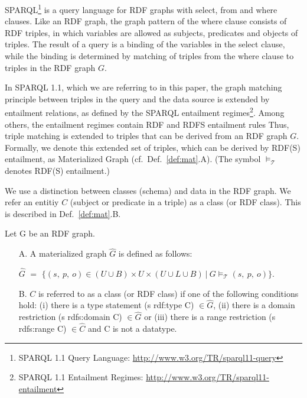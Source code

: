 \documentclass{llncs} %
\begin{document}
SPARQL\footnote{SPARQL 1.1 Query Language: \url{http://www.w3.org/TR/sparql11-query}} 
is a query language for RDF graphs with  \textsf{select}, \textsf{from} and \textsf{where} clauses.
Like an RDF graph, the graph pattern of the \textsf{where} clause consists of RDF triples, in which
variables are allowed as subjects, predicates and objects of triples.
The result of a query is a binding of the variables in the \textsf{select} clause,
while the binding is determined by matching of triples from the \textsf{where} clause
to triples in the RDF graph $G$.

In SPARQL 1.1, which we are referring to in this paper, the graph matching principle between triples in the query and the data source
is extended by entailment relations, as defined by the SPARQL entailment regimes\footnote{SPARQL 1.1 Entailment Regimes:
\url{http://www.w3.org/TR/sparql11-entailment}}. Among others, the entailment regimes contain RDF and RDFS entailment rules
Thus, triple matching is extended to triples that can be derived from an RDF graph $G$. Formally, we denote
this extended set of triples, which can be derived by RDF(S) entailment, as Materialized Graph (cf.~Def.~\ref{def:mat}.A).
(The symbol $\models_{\mathcal{T}}$ denotes RDF(S) entailment.)

We use a distinction between classes (schema) and data in the RDF graph.
We refer an entitiy $C$ (subject or predicate in a triple) as a class (or RDF class).
This is described in Def.~\ref{def:mat}.B.
 

\begin{definition}
\label{def:mat}
Let $\mathrm{G}$ be an RDF graph.
\begin{itemize}
	\item[A.]  A materialized graph $\hat{G}$ is defined as follows:

$\hat{G}$ $=$ $\{ (s ,\ p , \ o) \in (U\cup B)\times U \times (U\cup L \cup B) \ | \ G \models_{\mathcal{T}} (s, \ p, \ o) \}  $. 

\item[B.] $C$ is referred to as a class (or RDF class) if one of the following conditions hold:
(i) there is a type statement  (s rdf:type C) $\in \hat{G}$,
 (ii) there is a domain restriction (s rdfs:domain C) $\in \hat{G}$ or 
(iii) there is a range restriction (s rdfs:range C) $\in \hat{C}$ and C is not a datatype.
\end{itemize}
\end{definition}
\end{document}
